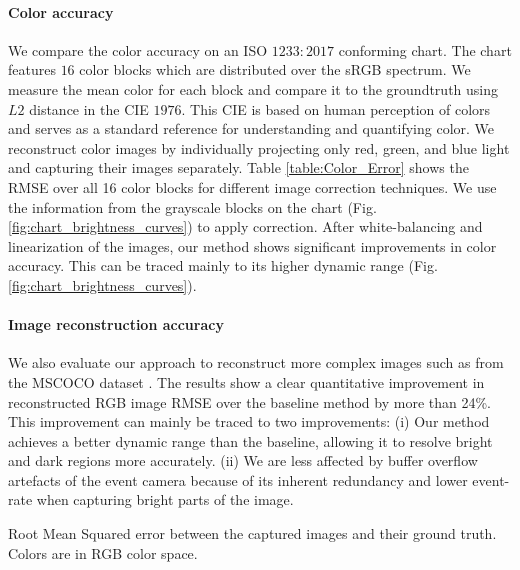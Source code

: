 \paragraph{Color accuracy}
% 
We compare the color accuracy on an ISO $1233:2017$ conforming chart.
The chart features $16$ color blocks which are distributed over the sRGB spectrum.
We measure the mean color for each block and compare it to the groundtruth using $L2$ distance in the CIE $1976$.
This CIE is based on human perception of colors and serves as a standard reference for understanding and quantifying color.
We reconstruct color images by individually projecting only red, green, and blue light and capturing their images separately.
Table \ref{table:Color_Error} shows the RMSE over all 16 color blocks for different image correction techniques. 
We use the information from the grayscale blocks on the chart (Fig. \ref{fig:chart_brightness_curves}) to apply correction.
After white-balancing and linearization of the images, our method shows significant improvements in color accuracy. 
This can be traced mainly to its higher dynamic range (Fig. \ref{fig:chart_brightness_curves}).

% 

\paragraph{Image reconstruction accuracy}

We also evaluate our approach to reconstruct more complex images such as from the MSCOCO dataset \cite{MSCOCO}.
The results show a clear quantitative improvement in reconstructed RGB image RMSE over the baseline method\cite{RGBD} by more than 24\%. This improvement can mainly be traced to two improvements: 
(i) Our method achieves a better dynamic range than the baseline, allowing it to resolve bright and dark regions more accurately. 
(ii) We are less affected by buffer overflow artefacts of the event camera because of its inherent redundancy and lower event-rate when capturing bright parts of the image.

\begin{table}[]
    \centering
    
    \caption[Image Capture Errors]{Root Mean Squared error between the captured images and their ground truth. Colors are in RGB color space.}
    \label{fig:coco_results}
\end{table}
